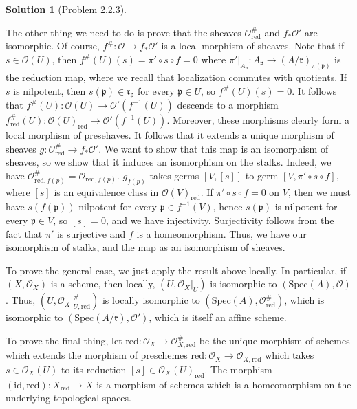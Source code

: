 \documentclass[aps,pra,showpacs,notitlepage,onecolumn,superscriptaddress,nofootinbib]{revtex4-1}
\theoremstyle{definition}
\newtheorem{solution}{Solution}[section]
\begin{document}
\begin{solution}[Problem 2.2.3]
\begin{enumerate}
        The other thing we need to do is prove that the sheaves $\mathcal{O}_{\text{red}}^{\#}$ and $f_{*} \mathcal{O}'$ are isomorphic. Of course, $f^{\#} : \mathcal{O} \rightarrow f_{*} \mathcal{O}'$ is a local morphism
        of sheaves. Note that if $s \in \mathcal{O}(U)$, then $f^{\#}(U)(s) = \pi' \circ s \circ f = 0$ where $\pi'|_{A_{\mathfrak{p}}} : A_{\mathfrak{p}} \rightarrow (A/\mathfrak{r})_{\pi(\mathfrak{p})}$ is the reduction map,
        where we recall that localization commutes with quotients. If $s$ is nilpotent, then $s(\mathfrak{p}) \in \mathfrak{r}_{\mathfrak{p}}$ for every $\mathfrak{p} \in U$, so $f^{\#}(U)(s) = 0$. It follows that
        $f^{\#}(U) : \mathcal{O}(U) \rightarrow \mathcal{O}'(f^{-1}(U))$ descends to a morphism $f^{\#}_{\text{red}}(U) : \mathcal{O}(U)_{\text{red}} \rightarrow \mathcal{O}'(f^{-1}(U))$. Moreover, these morphisms
        clearly form a local morphism of presehaves. It follows that it extends a unique morphism of sheaves $g : \mathcal{O}_{\text{red}}^{\#} \rightarrow f_{*} \mathcal{O}'$. We want to show that
        this map is an isomorphism of sheaves, so we show that it induces an isomorphism on the stalks. Indeed, we have $\mathcal{O}_{\text{red}, f(p)}^{\#} = \mathcal{O}_{\text{red}, f(p)}$. $g_{f(p)}$ takes
        germs $[V, [s]]$ to germ $[V, \pi' \circ s \circ f]$, where $[s]$ is an equivalence class in $\mathcal{O}(V)_{\text{red}}$. If $\pi' \circ s \circ f = 0$ on $V$, then we must have $s(f(\mathfrak{p}))$ nilpotent
        for every $\mathfrak{p} \in f^{-1}(V)$, hence $s(\mathfrak{p})$ is nilpotent for every $\mathfrak{p} \in V$, so $[s] = 0$, and we have injectivity. Surjectivity follows from the fact that $\pi'$ is surjective and
        $f$ is a homeomorphism. Thus, we have our isomorphism of stalks, and the map as an isomorphism of sheaves.

        To prove the general case, we just apply the result above locally. In particular, if $(X, \mathcal{O}_X)$ is a scheme, then locally, $(U, \mathcal{O}_X|_U)$ is isomorphic to $(\text{Spec}(A), \mathcal{O})$. Thus,
        $(U, \mathcal{O}_{X}|_{U, \text{red}}^{\#})$ is locally isomorphic to $(\text{Spec}(A), \mathcal{O}_{\text{red}}^{\#})$, which is isomorphic to $(\text{Spec}(A/\mathfrak{r}), \mathcal{O}')$, which is itself
        an affine scheme.

        To prove the final thing, let $\text{red} : \mathcal{O}_X \rightarrow \mathcal{O}_{X, \text{red}}^{\#}$ be the unique morphism of schemes which extends the morphism of preschemes
        $\text{red} : \mathcal{O}_X \rightarrow \mathcal{O}_{X, \text{red}}$ which takes $s \in \mathcal{O}_X(U)$ to its reduction $[s] \in \mathcal{O}_X(U)_{\text{red}}$. The morphism
        $(\text{id}, \text{red}) : X_{\text{red}} \rightarrow X$ is a morphism of schemes which is a homeomorphism on the underlying topological spaces.


\end{enumerate}
\end{solution}
\end{document}

